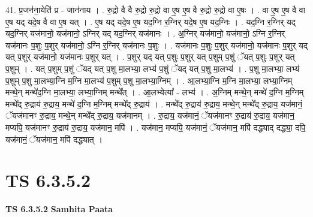 \documentclass[17pt]{extarticle}
\begin{document}
41. प्र॒जन॑ना॒येति॑ प्र - जान॑नाय । . रु॒द्रो वै वै रु॒द्रो रु॒द्रो वा ए॒ष ए॒ष वै रु॒द्रो रु॒द्रो वा ए॒षः । . वा ए॒ष ए॒ष वै वा ए॒ष यद् यदे॒ष वै वा ए॒ष यत् । . ए॒ष यद् यदे॒ष ए॒ष यद॒ग्नि र॒ग्निर् यदे॒ष ए॒ष यद॒ग्निः । . यद॒ग्नि र॒ग्निर् यद् यद॒ग्निर् यज॑मानो॒ यज॑मानो॒ ऽग्निर् यद् यद॒ग्निर् यज॑मानः । . अ॒ग्निर् यज॑मानो॒ यज॑मानो॒ ऽग्नि र॒ग्निर् यज॑मानः प॒शुः प॒शुर् यज॑मानो॒ ऽग्नि र॒ग्निर् यज॑मानः प॒शुः । . यज॑मानः प॒शुः प॒शुर् यज॑मानो॒ यज॑मानः प॒शुर् यद् यत् प॒शुर् यज॑मानो॒ यज॑मानः प॒शुर् यत् । . प॒शुर् यद् यत् प॒शुः प॒शुर् यत् प॒शुम् प॒शुं ॅयत् प॒शुः प॒शुर् यत् प॒शुम् । . यत् प॒शुम् प॒शुं ॅयद् यत् प॒शु मा॒लभ्या॒ लभ्य॑ प॒शुं ॅयद् यत् प॒शु मा॒लभ्य॑ । . प॒शु मा॒लभ्या॒ लभ्य॑ प॒शुम् प॒शु मा॒लभ्या॒ग्नि म॒ग्नि मा॒लभ्य॑ प॒शुम् प॒शु मा॒लभ्या॒ग्निम् । . आ॒लभ्या॒ग्नि म॒ग्नि मा॒लभ्या॒ लभ्या॒ग्निम् मन्थे॒न् मन्थे॑द॒ग्नि मा॒लभ्या॒ लभ्या॒ग्निम् मन्थे᳚त् । . आ॒लभ्येत्या᳚ - लभ्य॑ । . अ॒ग्निम् मन्थे॒न् मन्थे॑ द॒ग्नि म॒ग्निम् मन्थे᳚द् रु॒द्राय॑ रु॒द्राय॒ मन्थे॑ द॒ग्नि म॒ग्निम् मन्थे᳚द् रु॒द्राय॑ । . मन्थे᳚द् रु॒द्राय॑ रु॒द्राय॒ मन्थे॒न् मन्थे᳚द् रु॒द्राय॒ यज॑मानं॒ ॅयज॑मानꣳ रु॒द्राय॒ मन्थे॒न् मन्थे᳚द् रु॒द्राय॒ यज॑मानम् । . रु॒द्राय॒ यज॑मानं॒ ॅयज॑मानꣳ रु॒द्राय॑ रु॒द्राय॒ यज॑मान॒ मप्यपि॒ यज॑मानꣳ रु॒द्राय॑ रु॒द्राय॒ यज॑मान॒ मपि॑ । . यज॑मान॒ मप्यपि॒ यज॑मानं॒ ॅयज॑मान॒ मपि॑ दद्ध्याद् दद्ध्या॒ दपि॒ यज॑मानं॒ ॅयज॑मान॒ मपि॑ दद्ध्यात् । \newline
\pagebreak
{}

\section{ TS 6.3.5.2 }

\textbf{TS 6.3.5.2 } \newline
\textbf{Samhita Paata} \newline
\end{document}
